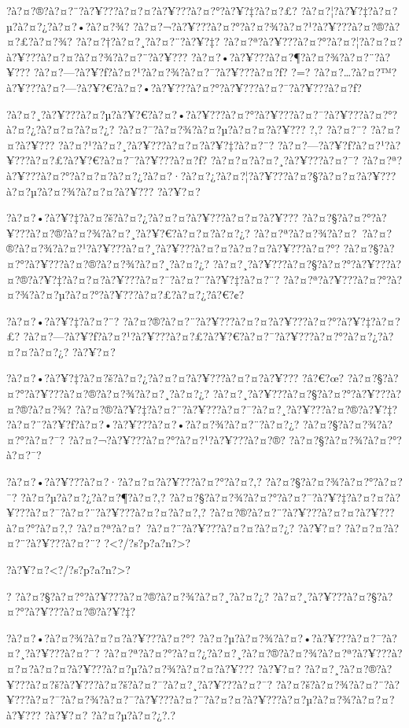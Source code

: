 \documentclass[11pt, openany]{book}
\begin{document}
{{{{{{{?à?¤?®?à?¤?¨?à?¥???à?¤?¤?à?¥???à?¤?°?à?¥?‡?à?¤?£?
?à?¤?¦?à?¥?‡?à?¤?µ?à?¤?¿?à?¤?•?à?¤?¾?
?à?¤?¬?à?¥???à?¤?°?à?¤?¾?à?¤?¹?à?¥???à?¤?®?à?¤?£?à?¤?¾?
?à?¤?†?à?¤?¸?à?¤?¨?à?¥?‡?
?à?¤?ª?à?¥???à?¤?°?à?¤?¦?à?¤?¤?à?¥???à?¤?¤?à?¤?¾?à?¤?¨?à?¥???
?à?¤?•?à?¥???à?¤?¶?à?¤?¾?à?¤?¨?à?¥???
?à?¤?---?à?¥?ƒ?à?¤?¹?à?¤?¾?à?¤?¯?à?¥???à?¤?ƒ? ?=?
?à?¤?\ldots{}?à?¤?™?à?¥???à?¤?---?à?¥?€?à?¤?•?à?¥???à?¤?°?à?¥???à?¤?¯?à?¥???à?¤?ƒ?

?à?¤?¸?à?¥???à?¤?µ?à?¥?€?à?¤?•?à?¥???à?¤?°?à?¥???à?¤?¯?à?¥???à?¤?°?à?¤?¿?à?¤?¤?à?¤?¿?
?à?¤?¯?à?¤?¾?à?¤?µ?à?¤?¤?à?¥??? ?,? ?à?¤?¨? ?à?¤?¤?à?¥???
?à?¤?¹?à?¤?¸?à?¥???à?¤?¤?à?¥?‡?à?¤?¨?
?à?¤?---?à?¥?ƒ?à?¤?¹?à?¥???à?¤?£?à?¥?€?à?¤?¯?à?¥???à?¤?ƒ?
?à?¤?¤?à?¤?¸?à?¥???à?¤?¯?
?à?¤?ª?à?¥???à?¤?°?à?¤?¤?à?¤?¿?à?¤?·?à?¤?¿?à?¤?¦?à?¥???à?¤?§?à?¤?¤?à?¥???à?¤?µ?à?¤?¾?à?¤?¤?à?¥???
?à?¥?¤?

?à?¤?•?à?¥?‡?à?¤?š?à?¤?¿?à?¤?¤?à?¥???à?¤?¤?à?¥???
?à?¤?§?à?¤?°?à?¥???à?¤?®?à?¤?¾?à?¤?¸?à?¥?€?à?¤?¤?à?¤?¿?
?à?¤?ª?à?¤?¾?à?¤?~?à?¤?®?à?¤?¾?à?¤?¹?à?¥???à?¤?¸?à?¥???à?¤?¤?à?¤?¤?à?¥???à?¤?°?
?à?¤?§?à?¤?°?à?¥???à?¤?®?à?¤?¾?à?¤?¸?à?¤?¿?
?à?¤?¸?à?¥???à?¤?§?à?¤?°?à?¥???à?¤?®?à?¥?‡?à?¤?¤?à?¥???à?¤?¯?à?¤?¨?à?¥?‡?à?¤?¨?
?à?¤?ª?à?¥???à?¤?°?à?¤?¾?à?¤?µ?à?¤?°?à?¥???à?¤?£?à?¤?¿?â?€?¢?

?à?¤?•?à?¥?‡?à?¤?¨? ?à?¤?®?à?¤?¨?à?¥???à?¤?¤?à?¥???à?¤?°?à?¥?‡?à?¤?£?
?à?¤?---?à?¥?ƒ?à?¤?¹?à?¥???à?¤?£?à?¥?€?à?¤?¯?à?¥???à?¤?°?à?¤?¿?à?¤?¤?à?¤?¿?
?à?¥?¤?

?à?¤?•?à?¥?‡?à?¤?š?à?¤?¿?à?¤?¤?à?¥???à?¤?¤?à?¥??? ?â?€?œ?
?à?¤?§?à?¤?°?à?¥???à?¤?®?à?¤?¾?à?¤?¸?à?¤?¿?
?à?¤?¸?à?¥???à?¤?§?à?¤?°?à?¥???à?¤?®?à?¤?¾?
?à?¤?®?à?¥?‡?à?¤?¨?à?¥???à?¤?¯?à?¤?¸?à?¥???à?¤?®?à?¥?‡?
?à?¤?¨?à?¥?ƒ?à?¤?•?à?¥???à?¤?•?à?¤?¾?à?¤?¨?à?¤?¿?
?à?¤?§?à?¤?¾?à?¤?°?à?¤?¯? ?à?¤?¬?à?¥???à?¤?°?à?¤?¹?à?¥???à?¤?®?
?à?¤?§?à?¤?¾?à?¤?°?à?¤?¯?

?à?¤?•?à?¥???à?¤?·?à?¤?¤?à?¥???à?¤?°?à?¤?‚? ?à?¤?§?à?¤?¾?à?¤?°?à?¤?¯?
?à?¤?µ?à?¤?¿?à?¤?¶?à?¤?‚?
?à?¤?§?à?¤?¾?à?¤?°?à?¤?¯?à?¥?‡?à?¤?¤?à?¥???à?¤?¯?à?¤?¨?à?¥???à?¤?¤?à?¤?‚?
?à?¤?®?à?¤?¨?à?¥???à?¤?¤?à?¥???à?¤?°?à?¤?‚?
?à?¤?ª?à?¤?~?à?¤?¨?à?¥???à?¤?¤?à?¤?¿? ?à?¥?¤? ?à?¤?¤?à?¤?¨?à?¥???à?¤?¨?
?\textless{}?/?s?p?a?n?\textgreater{}?

?à?¥?¤?\textless{}?/?s?p?a?n?\textgreater{}?

? ?à?¤?§?à?¤?°?à?¥???à?¤?®?à?¤?¾?à?¤?¸?à?¤?¿?
?à?¤?¸?à?¥???à?¤?§?à?¤?°?à?¥???à?¤?®?à?¥?‡?

?à?¤?•?à?¤?¾?à?¤?¤?à?¥???à?¤?°?
?à?¤?µ?à?¤?¾?à?¤?•?à?¥???à?¤?¯?à?¤?¸?à?¥???à?¤?¯?
?à?¤?ª?à?¤?°?à?¤?¿?à?¤?¸?à?¤?®?à?¤?¾?à?¤?ª?à?¥???à?¤?¤?à?¤?¤?à?¥???à?¤?µ?à?¤?¾?à?¤?¤?à?¥???
?à?¥?¤? ?à?¤?¸?à?¤?®?à?¥???à?¤?š?à?¥???à?¤?š?à?¤?¯?à?¤?¸?à?¥???à?¤?¯?
?à?¤?š?à?¤?¾?à?¤?¨?à?¥???à?¤?¯?à?¤?¾?à?¤?¯?à?¥???à?¤?¯?à?¤?¤?à?¥???à?¤?µ?à?¤?¾?à?¤?¤?à?¥???
?à?¥?¤? ?à?¤?µ?à?¤?¿?.?

}}}}}}}
\end{document}

